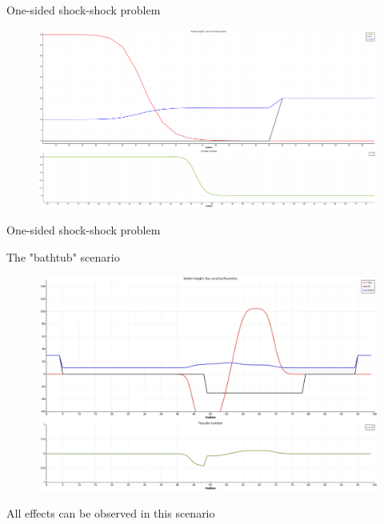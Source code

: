 \documentclass[shortpres]{beamer}
\newcommand{\imgfullscale}{0.75}
\begin{document}
\begin{frame}{One-sided shock-shock problem}
	\begin{figure}
		\includegraphics[clip, width=\imgfullscale\linewidth]{img/Shock_Wall.png}
	\end{figure}
	One-sided shock-shock problem
\end{frame}

\begin{frame}{The "bathtub" scenario}
	\begin{figure}
		\includegraphics[clip, width=\imgfullscale\linewidth]{img/bathtub.png}
	\end{figure}
	All effects can be observed in this scenario
\end{frame}
\end{document}
